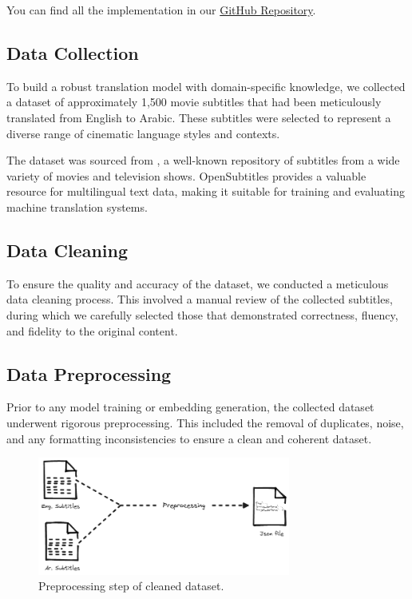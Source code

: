 \documentclass[12pt]{article}
\begin{document}
You can find all the implementation in our \href{https://github.com/mhannani/Adaptive_Machine_translation_with_LLMs/}{GitHub Repository}.



\subsection{Data Collection}

To build a robust translation model with domain-specific knowledge, we collected a dataset of approximately 1,500 movie subtitles that had been meticulously translated from English to Arabic. These subtitles were selected to represent a diverse range of cinematic language styles and contexts.

The dataset was sourced from \cite{opensubtitles}, a well-known repository of subtitles from a wide variety of movies and television shows. OpenSubtitles provides a valuable resource for multilingual text data, making it suitable for training and evaluating machine translation systems.


\subsection{Data Cleaning}
To ensure the quality and accuracy of the dataset, we conducted a meticulous data cleaning process. This involved a manual review of the collected subtitles, during which we carefully selected those that demonstrated correctness, fluency, and fidelity to the original content.

\subsection{Data Preprocessing}
Prior to any model training or embedding generation, the collected dataset underwent rigorous preprocessing. This included the removal of duplicates, noise, and any formatting inconsistencies to ensure a clean and coherent dataset.

\begin{figure}[h]
	\centering
	\includegraphics[width=0.74\textwidth]{assets/preprocessing.png}
	\caption{Preprocessing step of cleaned dataset.}
	\label{fig:preprocessing}
\end{figure}
\end{document}
